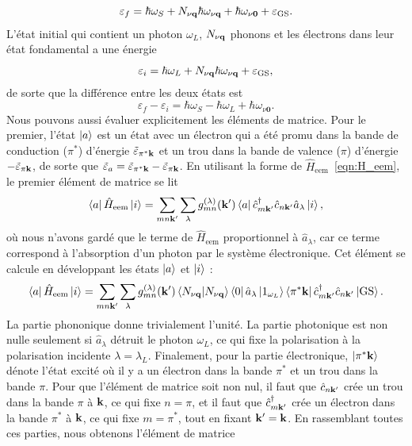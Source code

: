 \begin{equation}
    \varepsilon_f = \hbar\omega_S + N_{\nu\mathbf{q}}\hbar\omega_{\nu\mathbf{q}} +\hbar\omega_{\nu\bm 0}+ \varepsilon_\text{GS}.
\end{equation}
L'état initial qui contient un photon $\omega_L$, $N_{\nu\mathbf{q}}$ phonons et les électrons dans leur état fondamental a une énergie
\begin{equation}
    \varepsilon_i =\hbar\omega_L+N_{\nu\mathbf{q}}\hbar\omega_{\nu\mathbf{q}} +\varepsilon_\text{GS},
\end{equation}
de sorte que la différence entre les deux états est
\begin{equation}
    \varepsilon_f-\varepsilon_i = \hbar\omega_S - \hbar\omega_L +\hbar\omega_{\nu\bm 0}.
\end{equation}
Nous pouvons aussi évaluer explicitement les éléments de matrice. Pour le premier, l'état $\ket{a}$ est un état avec un électron qui a été promu dans la bande de conduction ($\pi^*$) d'énergie $\tilde{\varepsilon}_{\pi^*\mathbf{k}}$ et un trou dans la bande de valence ($\pi$) d'énergie $-\tilde{\varepsilon}_{\pi\mathbf{k}}$, de sorte que $\tilde{\varepsilon}_{a}=\tilde{\varepsilon}_{\pi^*\mathbf{k}}-\tilde{\varepsilon}_{\pi\mathbf{k}}$. En utilisant la forme de $\hat{H}_\text{eem}$~\eqref{eqn:H_eem}, le premier élément de matrice se lit
\begin{equation}
    \bra{a}\hat{H}_\text{eem}\ket{i} = \sum_{mn\mathbf{k}'}\sum_{\lambda}g_{mn}^{(\lambda)}(\mathbf{k}')\bra{a}\hat{c}^\dag_{m\mathbf{k}'}\hat{c}_{n\mathbf{k}'}\hat{a}_\lambda\ket{i},
\end{equation}
où nous n'avons gardé que le terme de $\hat{H}_\text{eem}$ proportionnel à $\hat{a}_\lambda$, car ce terme correspond à l'absorption d'un photon par le système électronique. Cet élément se calcule en développant les états $\ket{a}$ et $\ket{i}$ :
\begin{equation}
    \bra{a}\hat{H}_\text{eem}\ket{i} = \sum_{mn\mathbf{k}'}\sum_{\lambda}g_{mn}^{(\lambda)}(\mathbf{k}')\braket{N_{\nu\mathbf{q}}}{N_{\nu\mathbf{q}}}\bra{0}\hat{a}_{\lambda}\ket{1_{\omega_L}}\bra{\pi^*\mathbf{k}}\hat{c}_{m\mathbf{k}'}^\dag\hat{c}_{n\mathbf{k}'}\ket{\text{GS}}.
\end{equation}
La partie phononique donne trivialement l'unité. La partie photonique est non nulle seulement si $\hat{a}_\lambda$ détruit le photon $\omega_L$, ce qui fixe la polarisation à la polarisation incidente $\lambda=\lambda_L$. Finalement, pour la partie électronique, $\ket{\pi^*\mathbf{k}}$ dénote l'état excité où il y a un électron dans la bande $\pi^*$ et un trou dans la bande $\pi$. Pour que l'élément de matrice soit non nul, il faut que $\hat{c}_{n\mathbf{k}'}$ crée un trou dans la bande $\pi$ à $\mathbf{k}$, ce qui fixe $n=\pi$, et il faut que $\hat{c}_{m\mathbf{k}'}^\dag$ crée un électron dans la bande $\pi^*$ à $\mathbf{k}$, ce qui fixe $m=\pi^*$, tout en fixant $\mathbf{k}'=\mathbf{k}$. En rassemblant toutes ces parties, nous obtenons l'élément de matrice
